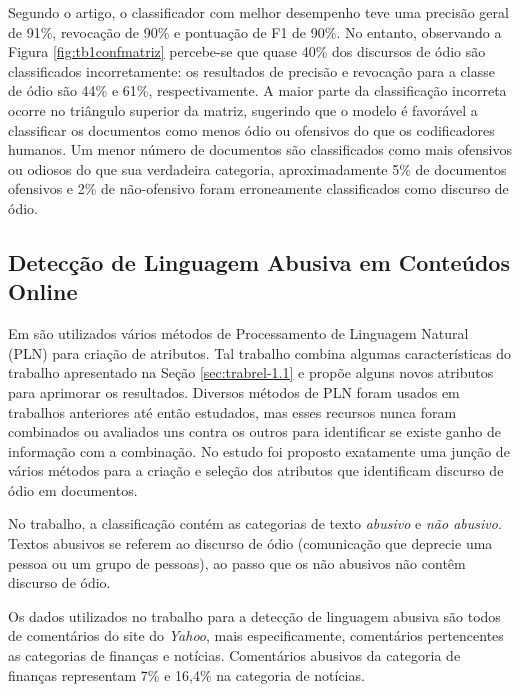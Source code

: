 Segundo o artigo, o classificador com melhor desempenho teve uma precisão geral de 91\%, revocação de 90\% e pontuação de F1 de 90\%. No entanto, observando a Figura \ref{fig:tb1confmatriz} percebe-se que quase 40\% dos discursos de ódio são classificados incorretamente: os resultados de precisão e revocação para a classe de ódio são 44\% e 61\%, respectivamente. A maior parte da classificação incorreta ocorre no triângulo superior da matriz, sugerindo que o modelo é favorável a classificar os documentos como menos ódio ou ofensivos do que os codificadores humanos. Um menor número de documentos são classificados como mais ofensivos ou odiosos do que sua verdadeira categoria, aproximadamente 5\% de documentos ofensivos e 2\% de não-ofensivo foram erroneamente classificados como discurso de ódio. 

\subsection{Detecção de Linguagem Abusiva em Conteúdos Online}\label{sec:trabrel-1.2}

Em \cite{nobata2016abusive} são utilizados vários métodos de Processamento de Linguagem Natural (PLN) para criação de atributos. Tal trabalho combina algumas características do trabalho apresentado na Seção \ref{sec:trabrel-1.1} e propõe alguns novos atributos para  aprimorar os  resultados. Diversos métodos de PLN foram usados em trabalhos anteriores até então estudados, mas esses recursos nunca foram combinados ou avaliados uns contra os outros para identificar se existe ganho de informação com a combinação. No estudo foi proposto exatamente uma junção de vários métodos para a criação e seleção dos atributos que identificam discurso de ódio em documentos.

No trabalho, a classificação contém as categorias de texto \textit{abusivo} e \textit{não abusivo}. Textos abusivos se referem ao discurso de ódio (comunicação que deprecie uma pessoa ou um grupo de pessoas), ao passo que os não abusivos não contêm discurso de ódio.

Os dados utilizados no trabalho para a detecção de linguagem abusiva são todos de comentários do site do {\it Yahoo}, mais especificamente, comentários pertencentes as categorias de finanças e notícias. Comentários abusivos da categoria de finanças representam 7\% e 16,4\% na categoria de notícias. 


